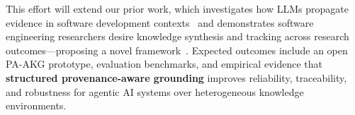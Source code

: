 \documentclass[conference, 10pt]{IEEEtran}
\begin{document}
This effort will extend our prior work, which investigates how LLMs propagate evidence in software development contexts~\cite{brown2025esem} and demonstrates software engineering researchers desire knowledge synthesis and tracking across research outcomes---proposing a novel framework~\cite{cusati2026fose}. Expected outcomes include an open PA-AKG prototype, evaluation benchmarks, and empirical evidence that \textbf{structured provenance-aware grounding} improves reliability, traceability, and robustness for agentic AI systems over heterogeneous knowledge environments.



\end{document}
